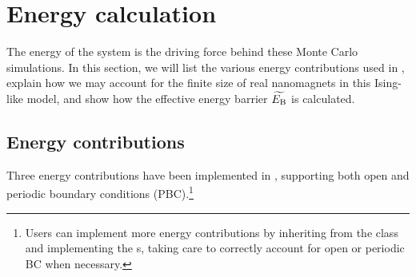 \section{Energy calculation}
The energy of the system is the driving force behind these Monte Carlo simulations.
In this section, we will list the various energy contributions used in \hotspice, explain how we may account for the finite size of real nanomagnets in this Ising-like model, and show how the effective energy barrier $\widetilde{E_\mathrm{B}}$ is calculated.

\subsection{Energy contributions}
Three energy contributions have been implemented in \hotspice, supporting both open and periodic boundary conditions (PBC).\footnote{
	Users can implement more energy contributions by inheriting from the  class and implementing the s, taking care to correctly account for open or periodic BC when necessary.
}
